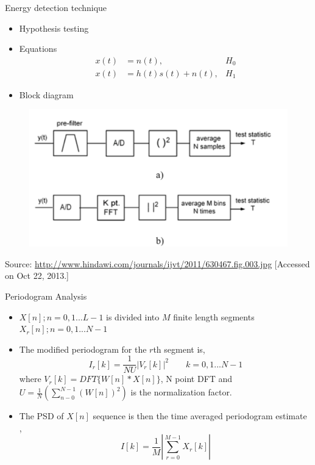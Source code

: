 \documentclass{beamer}
\begin{document}
   \begin{frame}{Energy detection technique}
    \begin{minipage}[t][0.8\textheight][t]{\textwidth}
      \begin{itemize}
        \item Hypothesis testing
        \item Equations
          \begin{align}
            x(t) &= n(t), & H_0 \nonumber \\
            x(t) &= h(t)s(t) + n(t), & H_1 \nonumber
          \end{align}
        \item Block diagram
      \end{itemize}
     \begin{figure}
        \centering
        \includegraphics[width=0.8\linewidth]{img/energyDetection}
      \end{figure}
      \vfill
      \tiny{Source: \url{http://www.hindawi.com/journals/ijvt/2011/630467.fig.003.jpg} 
      [Accessed  on Oct 22, 2013.]}
    \end{minipage}
  \end{frame}

  \begin{frame}{Periodogram Analysis}
    \begin{itemize}
        \item $X[n]; n = 0,1...L-1$ is  divided into $M$ finite length 
        segments $X_{r}[n]; n = 0,1...N-1 $
        \item The modified periodogram for the $r$th segment is,
          \begin{equation*}
              I_{r}[k] = \frac{1}{NU} \left| V_{r}[k]\right|^2     \qquad k = 0,1...N-1 
          \end{equation*}
          where $V_{r}[k] = DFT\{W[n]*X[n]\}$, N point DFT
          and $U = \frac{1}{N}(\sum_{n-0}^{N-1} (W[n])^2)$ is the normalization factor. 
        \item The PSD of $X[n]$ sequence 
          is then the time averaged periodogram estimate ,
          \begin{equation*}
              I[k] = \frac{1}{M}\left|\sum_{r=0}^{M-1}X_{r}[k]\right|
          \end{equation*}
    \end{itemize}
  \end{frame}
\end{document}
